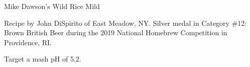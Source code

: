 \begin{recipe}{Mike Dawson's Wild Rice Mild}

\begin{aboutblock}
Recipe by John DiSpirito of East Meadow, NY. Silver medal in Category \#12:
Brown British Beer during the 2019 National Homebrew Competition
in Providence, RI. \sourceaha
\end{aboutblock}


\begin{methodandtiming}
 
\begin{mashsteps}
\end{mashsteps}

\begin{fermentationsteps}
\end{fermentationsteps}

\begin{directions}
Target a mash pH of 5.2.
\end{directions}

\end{methodandtiming}

\recipebreak

\begin{ingredientsblock}

\begin{malts}
\end{malts}

\begin{hops}
\end{hops}


\end{ingredientsblock}

\end{recipe}


